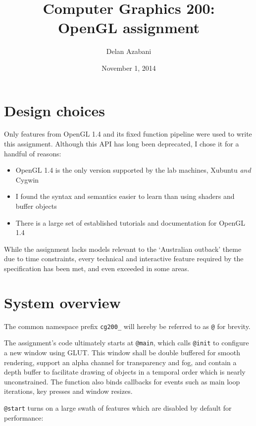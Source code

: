 \documentclass[a4paper,titlepage,12pt]{article}
\title{Computer Graphics 200:\\OpenGL assignment}
\date{November 1, 2014}
\author{Delan Azabani}
\begin{document}
\maketitle
{}

\section{Design choices}

Only features from OpenGL 1.4 and its fixed function pipeline were used to
write this assignment. Although this API has long been deprecated, I chose it
for a handful of reasons:

\begin{itemize}
	\item OpenGL 1.4 is the only version supported by the lab machines,
	      Xubuntu \textit{and} Cygwin
	\item I found the syntax and semantics easier to learn than using
	      shaders and buffer objects
	\item There is a large set of established tutorials and documentation
	      for OpenGL 1.4
\end{itemize}

While the assignment lacks models relevant to the `Australian outback' theme
due to time constraints, every technical and interactive feature required by
the specification has been met, and even exceeded in some areas.

\section{System overview}

The common namespace prefix \texttt{cg200\_} will hereby be referred to as
\texttt{@} for brevity.

The assignment's code ultimately starts at \texttt{@main}, which calls
\texttt{@init} to configure a new window using GLUT. This window shall be
double buffered for smooth rendering, support an alpha channel for transparency
and fog, and contain a depth buffer to facilitate drawing of objects in a
temporal order which is nearly unconstrained. The function also binds callbacks
for events such as main loop iterations, key presses and window resizes.

\texttt{@start} turns on a large swath of features which are disabled by
default for performance:
\end{document}
